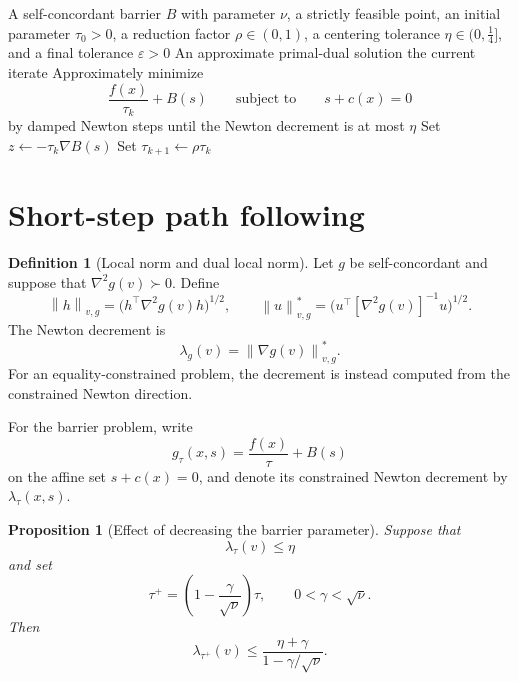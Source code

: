 \documentclass[a4paper,11pt]{book}
\theoremstyle{plain}
\newtheorem{proposition}[theorem]{Proposition}
\theoremstyle{definition}
\newtheorem{definition}[theorem]{Definition}
\theoremstyle{remark}
\numberwithin{equation}{chapter}
\numberwithin{algorithm}{chapter}
\newcommand{\norm}[1]{\left\|#1\right\|}
\begin{document}
	\begin{algorithm}[H]
		\caption{Barrier method}
		\begin{algorithmic}[1]
			\Require A self-concordant barrier \(B\) with parameter \(\nu\), a strictly
			feasible point, an initial parameter \(\tau_0>0\), a reduction factor
			\(\rho\in(0,1)\), a centering tolerance
			\(\eta\in(0,\tfrac14]\), and a final tolerance \(\varepsilon>0\)
			\Ensure An approximate primal-dual solution
			\State \Return the current iterate
			\EndIf
			\State Approximately minimize
			\[
			\frac{f(x)}{\tau_k}+B(s)
			\qquad
			\text{subject to}
			\qquad
			s+c(x)=0
			\]
			by damped Newton steps until the Newton decrement is at most \(\eta\)
			\State Set \(z\gets-\tau_k\nabla B(s)\)
			\State Set \(\tau_{k+1}\gets\rho\tau_k\)
			\EndFor
		\end{algorithmic}
	\end{algorithm}
	
	\section{Short-step path following}
	
	\begin{definition}[Local norm and dual local norm]
		Let \(g\) be self-concordant and suppose that
		\(\nabla^2g(v)\succ0\). Define
		\begin{equation}
			\norm{h}_{v,g}
			=
			\bigl(
			h^\top\nabla^2g(v)h
			\bigr)^{1/2},
			\qquad
			\norm{u}_{v,g}^*
			=
			\bigl(
			u^\top[\nabla^2g(v)]^{-1}u
			\bigr)^{1/2}.
		\end{equation}
		The Newton decrement is
		\[
		\lambda_g(v)
		=
		\norm{\nabla g(v)}_{v,g}^*.
		\]
		For an equality-constrained problem, the decrement is instead computed from
		the constrained Newton direction.
	\end{definition}
	
	For the barrier problem, write
	\[
	g_\tau(x,s)
	=
	\frac{f(x)}{\tau}+B(s)
	\]
	on the affine set \(s+c(x)=0\), and denote its constrained Newton decrement
	by \(\lambda_\tau(x,s)\).
	
	\begin{proposition}[Effect of decreasing the barrier parameter]
		Suppose that
		\[
		\lambda_\tau(v)\leq\eta
		\]
		and set
		\[
		\tau^+
		=
		\left(
		1-\frac{\gamma}{\sqrt{\nu}}
		\right)\tau,
		\qquad
		0<\gamma<\sqrt{\nu}.
		\]
		Then
		\begin{equation}
			\lambda_{\tau^+}(v)
			\leq
			\frac{\eta+\gamma}
			{1-\gamma/\sqrt{\nu}}.
			\label{eq:one-step-cut-bound}
		\end{equation}
	\end{proposition}
	
\end{document}
